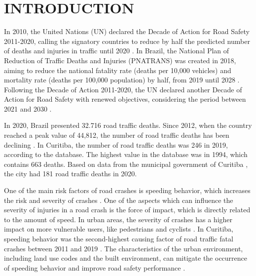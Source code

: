 

\chapter[INTRODUCTION]{INTRODUCTION} \label{cap:intro}






In 2010, the United Nations (UN) declared the Decade of Action for Road Safety 2011-2020, calling the signatory countries to reduce by half the predicted number of deaths and injuries in traffic until 2020 \cite{WHO2011}. In Brazil, the National Plan of Reduction of Traffic Deaths and Injuries (PNATRANS) was created in 2018, aiming to reduce the national fatality rate (deaths per 10,000 vehicles) and mortality rate (deaths per 100,000 population) by half, from 2019 until 2028 \cite{MinistryofCities2018}. Following the Decade of Action 2011-2020, the UN declared another Decade of Action for Road Safety with renewed objectives, considering the period between 2021 and 2030 \cite{WHO2020}.


In 2020, Brazil presented 32.716 road traffic deaths. Since 2012, when the country reached a peak value of 44,812, the number of road traffic deaths has been declining \cite{MinistryofHealth2022}. In Curitiba, the number of road traffic deaths was 246 in 2019, according to the \textcite{MinistryofHealth2020} database. The highest value in the database was in 1994, which contains 663 deaths. Based on data from the municipal government of Curitiba \cite{Curitiba2021}, the city had 181 road traffic deaths in 2020. 

One of the main risk factors of road crashes is speeding behavior, which increases the risk and severity of crashes \cite{Mohan2016}. One of the aspects which can influence the severity of injuries in a road crash is the force of impact, which is directly related to the amount of speed. In urban areas, the severity of crashes has a higher impact on more vulnerable users, like pedestrians and cyclists \cite{Welle2016}. In Curitiba, speeding behavior was the second-highest causing factor of road traffic fatal crashes between 2011 and 2019 \cite{Curitiba2020}. The characteristics of the urban environment, including land use codes and the built environment, can mitigate the occurrence of speeding behavior and improve road safety performance \cite{Knoflacher2016}. 

